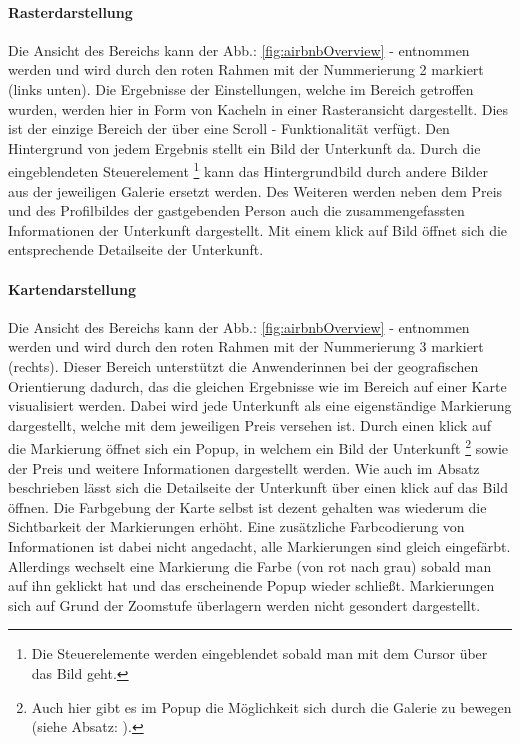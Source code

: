 \documentclass[../Bachelorarbeit.tex]{subfiles}
\begin{document}
\paragraph{Rasterdarstellung}
\label{airbnb:gridview}
Die Ansicht des Bereichs  kann der Abb.: \ref{fig:airbnbOverview} -  entnommen werden und wird durch den roten Rahmen mit der Nummerierung 2 markiert (links unten).
Die Ergebnisse der Einstellungen, welche im Bereich  getroffen wurden, werden hier in Form von Kacheln in einer Rasteransicht dargestellt.
Dies ist der einzige Bereich der über eine Scroll - Funktionalität verfügt.
Den Hintergrund von jedem Ergebnis stellt ein Bild der Unterkunft da. 
Durch die eingeblendeten Steuerelement
	\footnote{Die Steuerelemente werden eingeblendet sobald man mit dem Cursor über das Bild geht.} 
kann das Hintergrundbild durch andere Bilder aus der jeweiligen Galerie ersetzt werden. 
Des Weiteren werden neben dem Preis und des Profilbildes der gastgebenden Person auch die zusammengefassten Informationen der Unterkunft dargestellt. 
Mit einem klick auf Bild öffnet sich die entsprechende Detailseite der Unterkunft. 

\paragraph{Kartendarstellung}
\label{airbnb:map}
Die Ansicht des Bereichs  kann der Abb.: \ref{fig:airbnbOverview} -  entnommen werden und wird durch den roten Rahmen mit der Nummerierung 3 markiert (rechts).
Dieser Bereich unterstützt die Anwenderinnen bei der geografischen Orientierung dadurch, das die gleichen Ergebnisse wie im Bereich  auf einer Karte visualisiert werden.
Dabei wird jede Unterkunft als eine eigenständige Markierung dargestellt, welche mit dem jeweiligen Preis versehen ist.
Durch einen klick auf die Markierung öffnet sich ein Popup, in welchem ein Bild der Unterkunft
\footnote{
	Auch hier gibt es im Popup die Möglichkeit sich durch die Galerie zu bewegen (siehe Absatz: ).
	} 
sowie der Preis und weitere Informationen dargestellt werden. 
Wie auch im Absatz  beschrieben lässt sich die Detailseite der Unterkunft über einen klick auf das Bild öffnen.
Die Farbgebung der Karte selbst ist dezent gehalten was wiederum die Sichtbarkeit der Markierungen erhöht.
Eine zusätzliche Farbcodierung von Informationen ist dabei nicht angedacht, alle Markierungen sind gleich eingefärbt.
Allerdings wechselt eine Markierung die Farbe (von rot nach grau) sobald man auf ihn geklickt hat und das erscheinende Popup wieder schließt.
Markierungen sich auf Grund der Zoomstufe überlagern werden nicht gesondert dargestellt.
\end{document}
